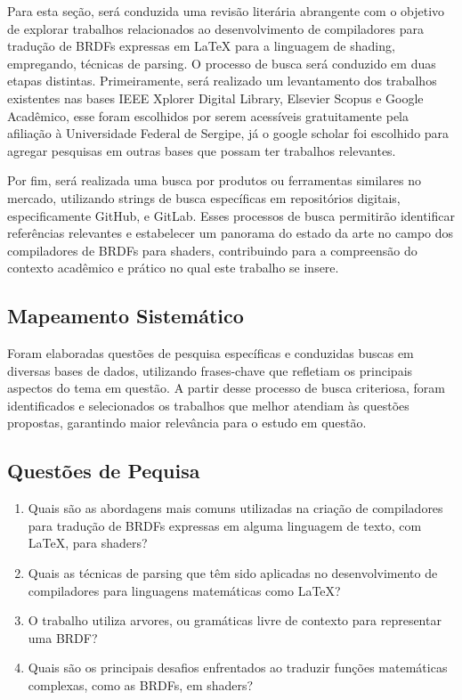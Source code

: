 \documentclass[english, 
               brazil, 
               bsc] %
               {dcomp-abntex2}
\begin{document}
Para esta seção, será conduzida uma revisão literária abrangente com o objetivo de explorar trabalhos relacionados ao desenvolvimento de compiladores para tradução de BRDFs expressas em LaTeX para a linguagem de shading, empregando, técnicas de parsing.
O processo de busca será conduzido em duas etapas distintas. Primeiramente, será realizado um levantamento dos trabalhos existentes nas bases IEEE Xplorer Digital Library, Elsevier Scopus e Google Acadêmico, esse foram escolhidos por serem acessíveis gratuitamente pela afiliação à Universidade Federal de Sergipe, já o google scholar foi escolhido para agregar pesquisas em outras bases que possam ter trabalhos relevantes.

Por fim, será realizada uma busca por produtos ou ferramentas similares no mercado, utilizando strings de busca específicas em repositórios digitais, especificamente GitHub, e GitLab. Esses processos de busca permitirão identificar referências relevantes e estabelecer um panorama do estado da arte no campo dos compiladores de BRDFs para shaders, contribuindo para a compreensão do contexto acadêmico e prático no qual este trabalho se insere.

\subsection{Mapeamento Sistemático}

Foram elaboradas questões de pesquisa específicas e conduzidas buscas em diversas bases de dados, utilizando frases-chave que refletiam os principais aspectos do tema em questão. A partir desse processo de busca criteriosa, foram identificados e selecionados os trabalhos que melhor atendiam às questões propostas, garantindo maior relevância para o estudo em questão.


\subsection{Questões de Pequisa}

\begin{enumerate}
  \item Quais são as abordagens mais comuns utilizadas na criação de compiladores para tradução de BRDFs expressas em alguma linguagem de texto, com LaTeX, para shaders?

  \item Quais as técnicas de parsing que têm sido aplicadas no desenvolvimento de compiladores para linguagens matemáticas como LaTeX?

  \item O trabalho utiliza arvores, ou gramáticas livre de contexto para representar uma BRDF?

 \item Quais são os principais desafios enfrentados ao traduzir funções matemáticas complexas, como as BRDFs, em shaders?

\end{enumerate}
\end{document}

